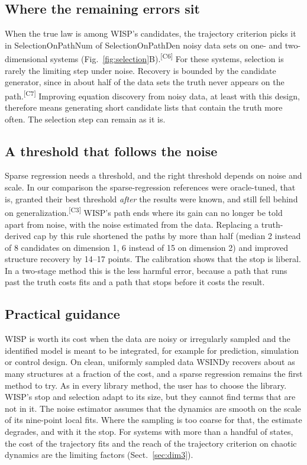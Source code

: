 \documentclass[10pt]{article}
\newcommand{\pv}[1]{\textcolor{prelim}{#1}}
\newcommand{\claimtag}[1]{\textsuperscript{\textcolor{prelim}{\sffamily\tiny[#1]}}}
\newcommand{\pv}[1]{#1}
\newcommand{\claimtag}[1]{}
\newcommand{\m}[1]{\pv{\csname #1\endcsname}}            %
\begin{document}
\subsection{Where the remaining errors sit}
When the true law is among WISP's candidates, the trajectory criterion picks it in \m{SelectionOnPathNum} of
\m{SelectionOnPathDen} noisy data sets on one- and two-dimensional systems (Fig.~\ref{fig:selection}B).\claimtag{C6}
For these systems, selection is rarely the limiting step under noise. Recovery is bounded by the candidate generator,
since in about \pv{half} of the data sets the truth never appears on the path.\claimtag{C7} Improving equation discovery
from noisy data, at least with this design, therefore means generating short candidate lists that contain the truth
more often. The selection step can remain as it is.

\subsection{A threshold that follows the noise}
Sparse regression needs a threshold, and the right threshold depends on noise and scale. In our comparison the
sparse-regression references were oracle-tuned, that is, granted their best threshold \emph{after} the results were
known, and still fell behind on generalization.\claimtag{C3} WISP's path ends where its gain can no longer be told apart
from noise, with the noise estimated from the data. Replacing a truth-derived cap by this rule shortened the paths by
more than half (median 2 instead of 8 candidates on dimension 1, 6 instead of 15 on dimension 2) and improved structure
recovery by 14--17 points. The calibration shows that the stop is liberal. In a two-stage method this is the less
harmful error, because a path that runs past the truth costs fits and a path that stops before it costs the result.

\subsection{Practical guidance}
WISP is worth its cost when the data are noisy or irregularly sampled and the identified model is meant to be
integrated, for example for prediction, simulation or control design. On clean, uniformly sampled data WSINDy recovers
about as many structures at a fraction of the cost, and a sparse regression remains the first method to try. As in
every library method, the user has to choose the library. WISP's stop and selection adapt to its size, but they cannot
find terms that are not in it. The noise estimator assumes that the dynamics are smooth on the scale of its nine-point
local fits. Where the sampling is too coarse for that, the estimate degrades, and with it the stop. For systems with
more than a handful of states, the cost of the trajectory fits and the reach of the trajectory criterion on chaotic
dynamics are the limiting factors (Sect.~\ref{sec:dim3}).
\end{document}
